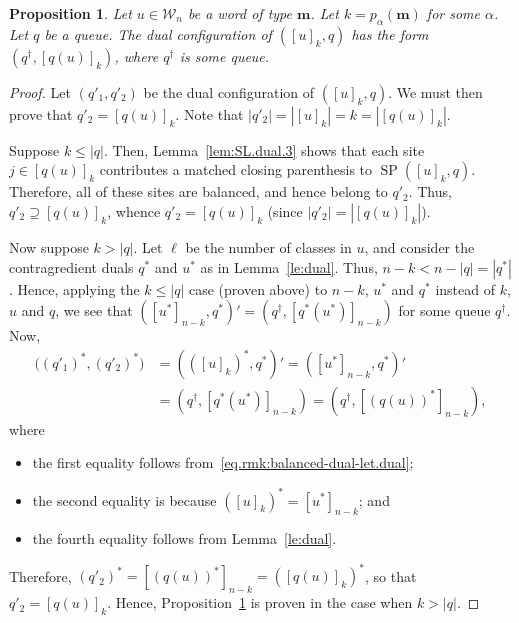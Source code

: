 \documentclass[reqno]{amsart}
\newcommand{\0}{\phantom{c}}
\newcommand{\mm}{\mathbf{m}}
\newcommand{\mcW}{\mathcal{W}}
\newcommand{\SP}{\operatorname{SP}}
\newcommand{\abs}[1]{\left| #1 \right|}
\newcommand{\tup}[1]{\left( #1 \right)}
\newcommand{\ive}[1]{\left[ #1 \right]}
\theoremstyle{plain}
\newtheorem{prop}[thm]{Proposition}
\theoremstyle{definition}
\numberwithin{equation}{section}
\begin{document}
\begin{prop} \label{prop:SL.dual}
Let $u \in \mcW_n$ be a word of type $\mm$.
Let $k = p_{\alpha}(\mm)$ for some $\alpha$.
Let $q$ be a queue.
The dual configuration of $\tup{ [u]_k , q }$ has the form $\tup{q^{\dagger} , [q(u)]_k }$, where $q^{\dagger}$ is some queue.
\end{prop}

\begin{proof}
Let $\tup{q'_1, q'_2}$ be the dual configuration of $\tup{ [u]_k , q }$.
We must then prove that $q'_2 = \ive{q(u)}_k$.
Note that $\abs{q'_2} = \abs{\ive{u}_k} = k = \abs{\ive{q(u)}_k}$.

Suppose $k \leq \abs{q}$.
Then, Lemma~\ref{lem:SL.dual.3} shows that each site $j \in \ive{q(u)}_k$ contributes a matched closing parenthesis to $\SP(\ive{u}_k, q)$.
Therefore, all of these sites are balanced, and hence belong to $q'_2$.
Thus, $q'_2 \supseteq \ive{q(u)}_k$, whence $q'_2 = \ive{q(u)}_k$
(since $\abs{q'_2} = \abs{\ive{q(u)}_k}$).

Now suppose $k > \abs{q}$.
Let $\ell$ be the number of classes in $u$, and consider the contragredient duals $q^*$ and $u^*$ as in Lemma~\ref{le:dual}.
Thus, $n-k < n - \abs{q} = \abs{q^*}$.
Hence, applying the $k \leq \abs{q}$ case (proven above)
to $n-k$, $u^*$ and $q^*$ instead of $k$, $u$ and $q$,
we see that
$\tup{ [u^*]_{n-k} , q^* }' = \tup{ q^\dagger , [q^*(u^*)]_{n-k} }$
for some queue $q^\dagger$.
Now,
\begin{align*}
 \bigl( (q'_1)^*, (q'_2)^* \bigr)
 &= \tup{ ([u]_k)^* , q^* }'
 = \tup{ [u^*]_{n-k} , q^* }' \\
 & = \tup{ q^\dagger , [q^*(u^*)]_{n-k} }
 = \tup{ q^\dagger , [(q(u))^*]_{n-k} } ,
\end{align*}
where
\begin{itemize}
 \item the first equality follows from~\eqref{eq.rmk:balanced-dual-let.dual};
 \item the second equality is because $([u]_k)^* = [u^*]_{n-k}$; and
 \item the fourth equality follows from Lemma~\ref{le:dual}.
\end{itemize}
Therefore, $(q'_2)^* = [(q(u))^*]_{n-k} = ([q(u)]_k)^*$, so that
$q'_2 = [q(u)]_k$.
Hence, Proposition~\ref{prop:SL.dual} is proven in the case when $k > \abs{q}$.
\end{proof}
\end{document}
